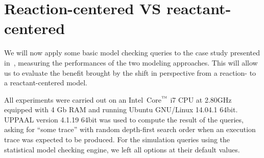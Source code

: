 \documentclass{llncs}
\newcommand{\tas}{Timed Automata}
\begin{document}


\section{Reaction-centered VS reactant-centered}\label{sec:animo-comparison}
We will now apply some basic model checking queries to the case study presented in~\cite{animo-ieee},
measuring the performances of the two modeling approaches. This will allow us to
evaluate the benefit brought by the shift in perspective from a reaction- to a reactant-centered model.

All experiments were carried out on an Intel\circledR\ Core$^{\mbox{\scriptsize\texttrademark}}$ i7 CPU at 2.80GHz equipped with 4 Gb RAM
and running Ubuntu GNU/Linux 14.04.1 64bit.
UPPAAL version 4.1.19 64bit was used to compute the result of the queries, asking for ``some trace'' with random depth-first search order
when an execution trace was expected to be produced. For the simulation queries using the statistical model checking engine, we left
all options at their default values.
\end{document}
